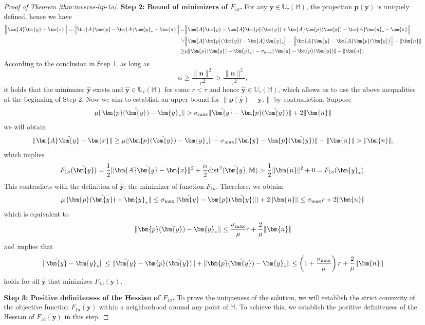 \documentclass{amsart} %
\def\vn{{\bm{n}}}
\def\vp{{\bm{p}}}
\def\vx{{\bm{x}}}
\def\vy{{\bm{y}}}
\def\mA{{\bm{A}}}
\def\sM{{\mathbb{M}}}
\def\sU{{\mathbb{U}}}
\theoremstyle{definition}
\theoremstyle{remark}
\begin{document}
\begin{proof}[Proof of Theorem \ref{thm:inverse-lip-1a}]
\textbf{Step 2: Bound of minimizers of $F_{1a}$.} For any $\vy \in \sU_{\tau}(\sM)$, the projection $\vp(\vy)$ is uniquely defined, hence we have
\[
\begin{aligned}
\Big\|\mA\vy - \vx\Big\| 
= \Big\|\mA\vy - \mA\vy_\ast - \vn\Big\| 
= & \Big\|\mA\vy - \mA \vp(\vy) + \mA \vp(\vy) - \mA\vy_\ast - \vn\Big\|  \\
\geq & \Big\|\mA \vp(\vy) - \mA\vy_\ast \Big\| - \Big\|\mA\vy - \mA \vp(\vy) \Big\| - \|\vn\| \\
\geq & \mu \|\vp(\vy) - \vy_\ast \| - \sigma_{\textup{max}} \|\vy - \vp(\vy) \| - \|\vn\|
\end{aligned}
\]
According to the conclusion in Step 1, as long as 
\begin{equation}
\label{eq:proof-alpha-2}
\alpha \geq \frac{\|\vn\|^2}{r^2} > \frac{\|\vn\|^2}{\tau^2},
\end{equation}
it holds that the minimizer $\hat{\vy}$ exists and $\hat{\vy} \in \overline{\sU}_r(\sM)$ for some $r < \tau$ and hence $\hat{\vy} \in \sU_\tau(\sM)$, which allows us to use the above inequalities at the beginning of Step 2. Now we aim to establish an upper bound for $\|\vp(\hat{\vy}) - \vy_\ast \|$ by contradiction. Suppose 
\[ \mu \|\vp(\hat{\vy}) - \vy_\ast \| > \sigma_{\textup{max}} \|\hat{\vy} - \vp(\hat{\vy}) \| + 2 \|\vn\|\]
we will obtain
\[\|\mA\hat{\vy} - \vx\| \geq \mu \|\vp(\hat{\vy}) - \vy_\ast \| - \sigma_{\textup{max}} \|\hat{\vy} - \vp(\hat{\vy}) \| - \|\vn\| > \|\vn\|,\]
which implies
\[ F_{1a}(\hat{\vy}) = \frac{1}{2} \|\mA\hat{\vy} - \vx\|^2 + \frac{\alpha}{2} \textup{dist}^2(\hat{\vy},\sM) > \frac{1}{2} \|\vn\|^2 + 0 = F_{1a}(\vy_\ast). \]
This contradicts with the definition of $\hat{\vy}$: the minimizer of function $F_{1a}$. Therefore, we obtain: 
\[
\mu \|\vp(\hat{\vy}) - \vy_\ast \| \leq \sigma_{\textup{max}} \|\hat{\vy} - \vp(\hat{\vy}) \| + 2 \|\vn\| \leq \sigma_{\textup{max}} r + 2 \|\vn\|
\]
which is equivalent to 
\[
\|\vp(\hat{\vy}) - \vy_\ast \| \leq \frac{\sigma_{\textup{max}}}{\mu} r + \frac{2}{\mu} \|\vn\| 
\]
and implies that
\begin{equation}
\label{eq:proof-error-bound}
\|\hat{\vy} - \vy_\ast\| \leq \|\hat{\vy} - \vp(\hat{\vy}) \| + \|\vp(\hat{\vy}) - \vy_\ast \| \leq \left(1 + \frac{\sigma_{\textup{max}}}{\mu} \right) r + \frac{2}{\mu} \|\vn\|
\end{equation}
holds for all $\hat{\vy}$ that minimizes $F_{1a}(\vy)$.

\textbf{Step 3: Positive definiteness of the Hessian of $F_{1a}$.} 
To prove the uniqueness of the solution, we will establish the strict convexity of the objective function $F_{1a}(\vy)$ within a neighborhood around any point of $\sM$. To achieve this, we establish the positive definiteness of the Hessian of $F_{1a}(\vy)$ in this step.



\end{proof}
\end{document}
